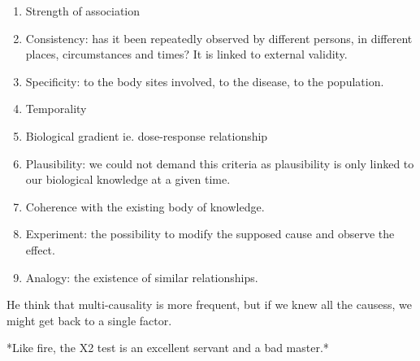 \begin{enumerate}
    \item Strength of association
    \item Consistency: has it been repeatedly observed by different persons, in
          different places, circumstances and times? It is linked to external
          validity.
    \item Specificity: to the body sites involved, to the disease, to the
          population.
    \item Temporality
    \item Biological gradient ie. dose-response relationship
    \item Plausibility: we could not demand this criteria as plausibility is only
          linked to our biological knowledge at a given time.
    \item Coherence with the existing body of knowledge.
    \item Experiment: the possibility to modify the supposed cause and observe
          the effect.
    \item Analogy: the existence of similar relationships.
\end{enumerate}


He think that multi-causality is more frequent, but if we knew all the causess,
we might get back to a single factor.

*Like fire, the X2 test is an excellent servant and a bad master.*